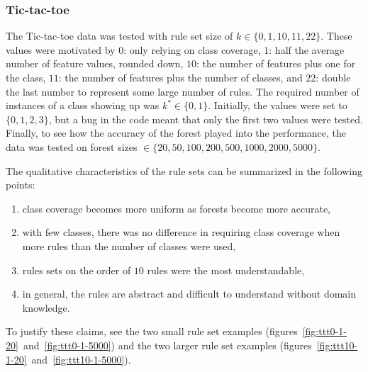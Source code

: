\documentclass[10pt]{article}
\begin{document}
\subsubsection{Tic-tac-toe}
The Tic-tac-toe data was tested with rule set size of $k \in \{0, 1, 10, 11, 22\}$. These values were motivated by $0$: only relying on class coverage, $1$: half the average number of feature values, rounded down, $10$: the number of features plus one for the class, $11$: the number of features plus the number of classes, and $22$: double the last number to represent some large number of rules. The required number of instances of a class showing up was $k^* \in \{0,1\}$. Initially, the values were set to $\{0,1,2,3\}$, but a bug in the code meant that only the first two values were tested. Finally, to see how the accuracy of the forest played into the performance, the data was tested on forest sizes $\in \{20, 50, 100, 200, 500, 1000, 2000, 5000\}$. 

The qualitative characteristics of the rule sets can be summarized in the following points:
\begin{enumerate}
\item class coverage becomes more uniform as forests become more accurate,
\item with few classes, there was no difference in requiring class coverage when more rules than the number of classes were used, 
\item rules sets on the order of $10$ rules were the most understandable,
\item in general, the rules are abstract and difficult to understand without domain knowledge.
\end{enumerate}
To justify these claims, see the two small rule set examples (figures~\ref{fig:ttt0-1-20}~and~\ref{fig:ttt0-1-5000}) and the two larger rule set examples (figures~\ref{fig:ttt10-1-20}~and~\ref{fig:ttt10-1-5000}). 
\end{document}
